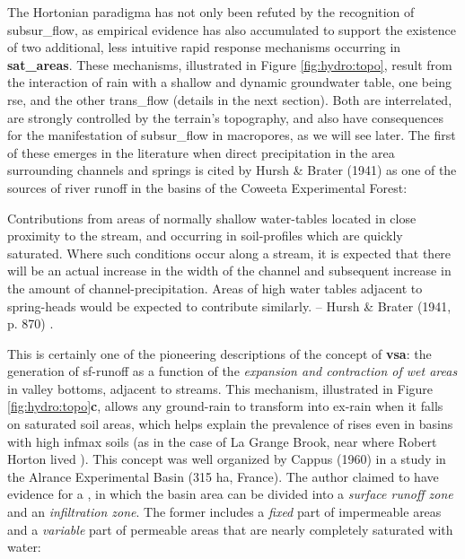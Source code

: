 \documentclass[./main_en.tex]{subfiles}
\begin{document}
\par The Hortonian \gls{paradigma} has not only been refuted by the recognition of \gls{subsur_flow}, as empirical evidence has also accumulated to support the existence of two additional, less intuitive rapid response mechanisms occurring in \textbf{\gls{sat_areas}}. These mechanisms, illustrated in Figure \ref{fig:hydro:topo}, result from the interaction of rain with a shallow and dynamic groundwater table, one being \gls{rse}, and the other \gls{trans_flow} (details in the next section). Both are interrelated, are strongly controlled by the terrain's topography, and also have consequences for the manifestation of \gls{subsur_flow} in macropores, as we will see later. The first of these emerges in the literature when direct precipitation in the area surrounding channels and springs is cited by Hursh \& Brater (1941) \cite{Hursh1941} as one of the sources of river runoff in the basins of the Coweeta Experimental Forest:  

\begin{adjustwidth}{100pt}{0pt}
\medskip
\small Contributions from areas of normally shallow water-tables located in close proximity to the stream, and occurring in soil-profiles which are quickly saturated. Where such conditions occur along a stream, it is expected that there will be an actual increase in the width of the channel and subsequent increase in the amount of channel-precipitation. Areas of high water tables adjacent to spring-heads would be expected to contribute similarly. -- Hursh \& Brater (1941, p. 870) \cite{Hursh1941}.
\medskip
\end{adjustwidth}

\noindent This is certainly one of the pioneering descriptions of the concept of \textbf{\gls{vsa}}: the generation of \gls{sf-runoff} as a function of the \textit{expansion and contraction of wet areas} in valley bottoms, adjacent to streams. This mechanism, illustrated in Figure \ref{fig:hydro:topo}\textbf{c}, allows any \gls{ground-rain} to transform into \gls{ex-rain} when it falls on saturated soil areas, which helps explain the prevalence of rises even in basins with high \gls{infmax} soils (as in the case of La Grange Brook, near where Robert Horton lived \cite{Beven2004c}). This concept was well organized by Cappus (1960) \cite{Cappus1960} in a study in the Alrance Experimental Basin (315 ha, France). The author claimed to have evidence for a , in which the basin area can be divided into a \textit{surface runoff zone} and an \textit{infiltration zone}. The former includes a \textit{fixed} part of impermeable areas and a \textit{variable} part of permeable areas that are nearly completely saturated with water:
\end{document}
